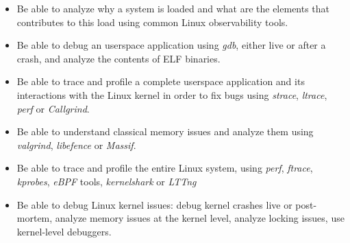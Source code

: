 {{\begin{itemize}
      relevant for performance analysis: process, threads, memory
      management, virtual memory, execution contexts, etc.
    \item Be able to analyze why a system is loaded and what are the
      elements that contributes to this load using common Linux
      observability tools.
    \item Be able to debug an userspace application using {\em gdb},
      either live or after a crash, and analyze the contents of ELF
      binaries.
    \item Be able to trace and profile a complete userspace application
      and its interactions with the Linux kernel in order to fix bugs
      using {\em strace}, {\em ltrace}, {\em perf} or {\em Callgrind}.
    \item Be able to understand classical memory issues and analyze them
      using {\em valgrind}, {\em libefence} or {\em Massif}.
    \item Be able to trace and profile the entire Linux system, using
      {\em perf}, {\em ftrace}, {\em kprobes}, {\em eBPF} tools, {\em
        kernelshark} or {\em LTTng}
    \item Be able to debug Linux kernel issues: debug kernel crashes
      live or post-mortem, analyze memory issues at the kernel level,
      analyze locking issues, use kernel-level debuggers.
      \vspace{-0.5cm}
    \end{itemize}
  }
}

\def \trainingprerequisites{
  \begin{itemize}
    \prerequisitecommandline
    \prerequisiteembeddedlinux
    \prerequisiteenglish
  \end{itemize}
}



